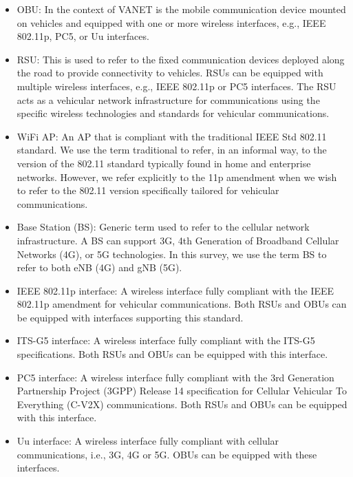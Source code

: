\documentclass[
  oneside,
  11pt, a4paper,
  footinclude=true,
  headinclude=true,
  cleardoublepage=empty
]{scrbook}
\begin{document}
\begin{itemize}
    \item 

    OBU: In the context of VANET is the mobile communication device mounted on vehicles and equipped with one or more wireless interfaces, e.g., IEEE 802.11p, PC5, or Uu interfaces.
     \item 
    
    RSU: This is used to refer to the fixed communication devices deployed along the road to provide connectivity to vehicles. RSUs can be equipped with multiple wireless interfaces, e.g., IEEE 802.11p or PC5 interfaces. The RSU acts as a vehicular network infrastructure for communications using the specific wireless technologies and standards for vehicular communications.
     \item 
    WiFi AP: An AP that is compliant with the traditional IEEE Std 802.11 standard. We use the term traditional to refer, in an informal way, to the version of the 802.11 standard typically found in home and enterprise networks. However, we refer explicitly to the 11p amendment when we wish to refer to the 802.11 version specifically tailored for vehicular communications.
     \item 
    Base Station (BS): Generic term used to refer to the cellular network infrastructure. A BS can support 3G, 4th Generation of Broadband Cellular Networks (4G), or 5G technologies. In this survey, we use the term BS to refer to both eNB (4G) and gNB (5G).
     \item 
    IEEE 802.11p interface: A wireless interface fully compliant with the IEEE 802.11p amendment for vehicular communications. Both RSUs and OBUs can be equipped with interfaces supporting this standard.
     \item 
    ITS-G5 interface: A wireless interface fully compliant with the ITS-G5 specifications. Both RSUs and OBUs can be equipped with this interface.
     \item 
    PC5 interface: A wireless interface fully compliant with the 3rd Generation Partnership Project (3GPP) Release 14 specification for Cellular Vehicular To Everything (C-V2X) communications. Both RSUs and OBUs can be equipped with this interface.
     \item 
    Uu interface: A wireless interface fully compliant with cellular communications, i.e., 3G, 4G or 5G. OBUs can be equipped with these interfaces.

\end{itemize}
\end{document}
